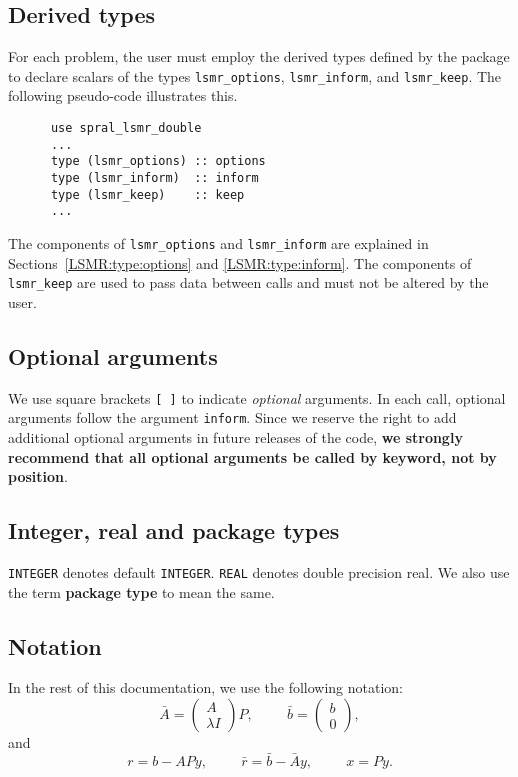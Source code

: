 \subsection{Derived types}

For each problem, the user must employ the derived types defined by the
package to declare scalars of the types
{\tt lsmr\_options}, {\tt lsmr\_inform}, and {\tt lsmr\_keep}.
The following pseudo-code illustrates this.
\begin{verbatim}
      use spral_lsmr_double
      ...
      type (lsmr_options) :: options
      type (lsmr_inform)  :: inform
      type (lsmr_keep)    :: keep
      ...
\end{verbatim}
The components of {\tt lsmr\_options} and {\tt lsmr\_inform} are explained
in Sections~\ref{LSMR:type:options} and \ref{LSMR:type:inform}.
The components of {\tt lsmr\_keep} are used to pass
data between calls and must not be altered by the user.


\subsection{Optional arguments}

We use square brackets {\tt [ ]} to indicate {\it optional} arguments.
In each
call, optional arguments follow the argument {\tt inform}.  Since we
reserve the right to add additional optional arguments in future
releases of the code, {\bf we strongly recommend that all optional
arguments be called by keyword, not by position}.

\subsection{Integer, real and package types}

{\tt INTEGER} denotes default {\tt INTEGER}.
{\tt REAL} denotes double precision real.
We also use the term {\bf package type} to mean the same.

\subsection{Notation}
In the rest of this documentation, we use the following notation:
$$
   \bar{A} = \left( \begin{array}{c}
         A \\
         \lambda I
      \end{array} \right)P, \hspace{1cm} \bar{b} = \left( \begin{array}{c}
         b \\
         0
      \end{array} \right),
$$
and
$$
   r = b - APy , \hspace{1cm}  \bar{r} = \bar{b} - \bar{A}y,
      \hspace{1cm}  x = Py.
$$

